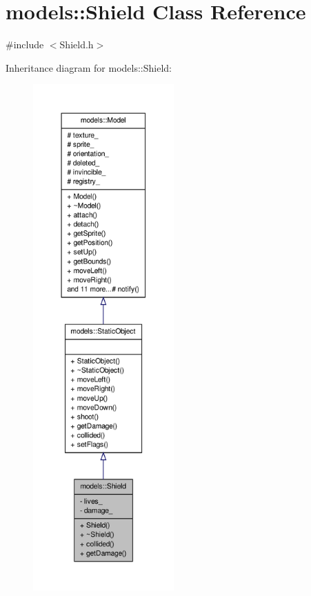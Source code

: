\hypertarget{classmodels_1_1Shield}{\section{models\-:\-:\-Shield \-Class \-Reference}
\label{d1/d8f/classmodels_1_1Shield}
}


{\ttfamily \#include $<$\-Shield.\-h$>$}



\-Inheritance diagram for models\-:\-:\-Shield\-:\nopagebreak
\begin{figure}[H]
\begin{center}
\leavevmode
\includegraphics[height=550pt]{de/d42/classmodels_1_1Shield__inherit__graph}
\end{center}
\end{figure}


